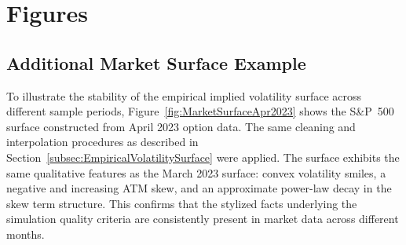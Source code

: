 \section{Figures} \label{sec:Figures}

\subsection*{Additional Market Surface Example}

To illustrate the stability of the empirical implied volatility surface across different sample periods, 
Figure~\ref{fig:MarketSurfaceApr2023} shows the S\&P~500 surface constructed from April 2023 option data. 
The same cleaning and interpolation procedures as described in Section~\ref{subsec:EmpiricalVolatilitySurface} 
were applied. The surface exhibits the same qualitative features as the March 2023 surface: convex volatility smiles, 
a negative and increasing ATM skew, and an approximate power-law decay in the skew term structure. 
This confirms that the stylized facts underlying the simulation quality criteria are consistently present 
in market data across different months.

